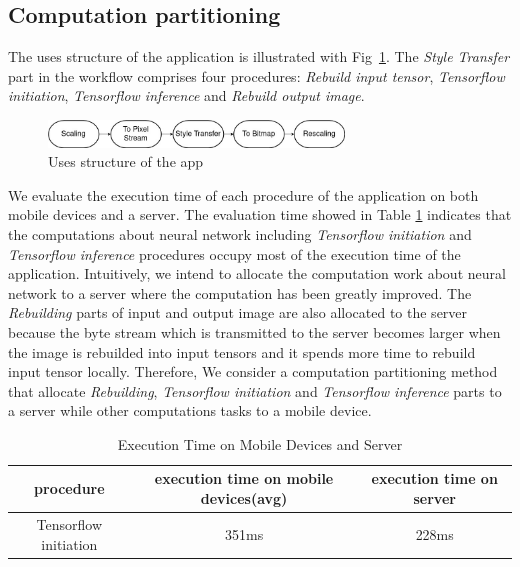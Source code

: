 \documentclass[a4paper,11pt,onecolumn,twoside]{article}
\begin{document}
\begin{CJK*}{GBK}{song}
\subsection{Computation partitioning}

The uses structure of the application is illustrated with Fig~\ref{fig:uses}.
The \emph{Style Transfer} part in the workflow comprises four procedures: 
\textit{Rebuild input tensor}, \textit{Tensorflow initiation}, 
\textit{Tensorflow inference} and \textit{Rebuild output image}.

\begin{figure}[!htb] %
  \centering %
  \includegraphics[width=0.7\textwidth]{uses} %
  \caption{Uses structure of the app} %
  \label{fig:uses} %
\end{figure}

We evaluate the execution time of each procedure of the application
on both mobile devices and a server.
The evaluation time showed in Table \ref{tb:1} indicates that the 
computations about neural network including 
\textit{Tensorflow initiation}
and \textit{Tensorflow inference}\cite{tensorflow2015-whitepaper} 
procedures occupy most of the execution time of the application. 
Intuitively, we intend to allocate the computation
work about neural network to a server where 
the computation has been greatly improved.
The \textit{Rebuilding} parts of input and output image are also
allocated to the server because the byte stream which is transmitted
to the server becomes larger when the image is rebuilded into 
input tensors and it spends more time to rebuild input tensor locally.
Therefore, We consider a computation partitioning method that
allocate \textit{Rebuilding}, \textit{Tensorflow initiation}
  and \textit{Tensorflow inference} parts 
  to a server while other computations tasks to a mobile device.


\begin{table}[H]
  \centering
  \caption{Execution Time on Mobile Devices and Server}\label{tb:1}
  \begin{tabular}{ccc}
    \hline
    procedure & execution time on mobile devices(avg) & execution time on server\\
    \hline
    Tensorflow initiation & 351ms & 228ms\\
    

\end{tabular}
\end{table}
\end{CJK*}
\end{document}
